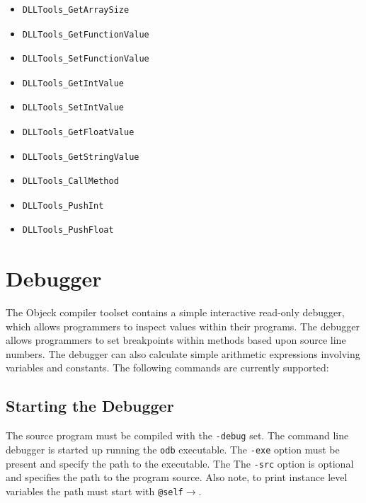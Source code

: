 \documentclass[12pt]{article}
\begin{document}
\begin{itemize}
\item \begin{verbatim}DLLTools_GetArraySize\end{verbatim}
\item \begin{verbatim}DLLTools_GetFunctionValue\end{verbatim}
\item \begin{verbatim}DLLTools_SetFunctionValue\end{verbatim}
\item \begin{verbatim}DLLTools_GetIntValue\end{verbatim}
\item \begin{verbatim}DLLTools_SetIntValue\end{verbatim}
\item \begin{verbatim}DLLTools_GetFloatValue\end{verbatim}
\item \begin{verbatim}DLLTools_GetStringValue\end{verbatim}
\item \begin{verbatim}DLLTools_CallMethod\end{verbatim}
\item \begin{verbatim}DLLTools_PushInt\end{verbatim}
\item \begin{verbatim}DLLTools_PushFloat\end{verbatim}
\end{itemize}

\section{Debugger}
The Objeck compiler toolset contains a simple interactive read-only
debugger, which allows programmers to inspect values within their
programs.  The debugger allows programmers to set breakpoints within
methods based upon source line numbers.  The debugger can also
calculate simple arithmetic expressions involving variables and
constants. The following commands are currently supported:

\subsection{Starting the Debugger}
The source program must be compiled with the \texttt{-debug} set. The
command line debugger is started up running the \texttt{odb}
executable. The \texttt{-exe} option must be present and specify the
path to the executable.  The The \texttt{-src} option is optional and
specifies the path to the program source.  Also note, to print
instance level variables the path must start with
\texttt{@self$\rightarrow$}.
\end{document}
